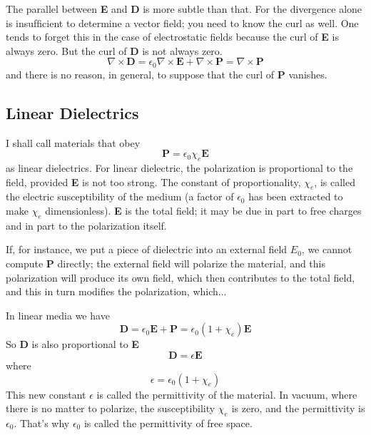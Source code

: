 \documentclass[../../../main.tex]{subfiles}
\begin{document}
The parallel between \textbf{E} and \textbf{D} is more subtle than that. For the divergence alone is insufﬁcient to determine a vector ﬁeld; you need to know the curl as well. One tends to forget this in the case of electrostatic ﬁelds  because the curl of \textbf{E} is always zero. But the curl of \textbf{D} is not always zero.
\begin{equation*}
    \nabla\times\mathbf{D}=\epsilon_0\nabla\times\mathbf{E}+\nabla\times\mathbf{P}= \nabla\times\mathbf{P}
\end{equation*}
and there is no reason, in general, to suppose that the curl of \textbf{P} vanishes.

\subsection{Linear Dielectrics}
I shall call materials that obey
\begin{equation*}
    \mathbf{P}=\epsilon_0\chi_e\mathbf{E}
\end{equation*}
as linear dielectrics. For linear dielectric, the polarization is proportional to the ﬁeld, provided \textbf{E} is not too strong. The constant of proportionality, $\chi_e$, is called the electric susceptibility of the medium (a factor of $\epsilon_0$ has been extracted to make $\chi_e$ dimensionless). \textbf{E} is the total ﬁeld; it may be due in part to free charges and in part to the polarization itself. 

If, for instance, we put a piece of dielectric into an external ﬁeld $E_0$, we cannot compute \textbf{P} directly; the external ﬁeld will polarize the material, and this polarization will produce its own ﬁeld, which then contributes to the total ﬁeld, and this in turn modiﬁes the polarization, which...

In linear media we have
\begin{equation*}
    \mathbf{D}=\epsilon_0\mathbf{E}+\mathbf{P}=\epsilon_0(1+\chi_e)\mathbf{E}
\end{equation*}
So \textbf{D} is also proportional to \textbf{E}
\begin{equation*}
    \mathbf{D}=\epsilon\mathbf{E}
\end{equation*}
where
\begin{equation*}
    \epsilon=\epsilon_0(1+\chi_e)
\end{equation*}
This new constant $\epsilon$ is called the permittivity of the material. In vacuum, where there is no matter to polarize, the susceptibility $\chi_e$ is zero, and the permittivity is $\epsilon_0$. That’s why $\epsilon_0$ is called the permittivity of free space. 
\end{document}
